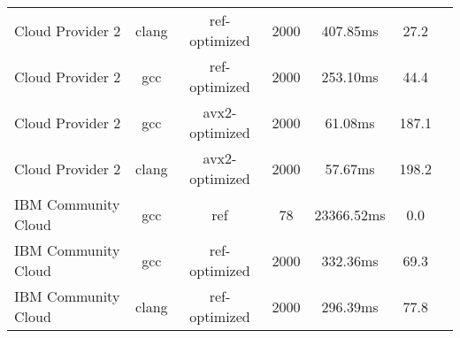 \begin{table}
\begin{tabularx}{\linewidth}{X c c c c c c}
            Cloud Provider 2 &                clang &        ref-optimized &                 2000 &             407.85ms &                 27.2\\
            Cloud Provider 2 &                  gcc &        ref-optimized &                 2000 &             253.10ms &                 44.4\\
            Cloud Provider 2 &                  gcc &       avx2-optimized &                 2000 &              61.08ms &                187.1\\
            Cloud Provider 2 &                clang &       avx2-optimized &                 2000 &              57.67ms &                198.2\\
         IBM Community Cloud &                  gcc &                  ref &                   78 &           23366.52ms &                  0.0\\
         IBM Community Cloud &                  gcc &        ref-optimized &                 2000 &             332.36ms &                 69.3\\
         IBM Community Cloud &                clang &        ref-optimized &                 2000 &             296.39ms &                 77.8 \\
        \bottomrule
    \end{tabularx}
\end{table}